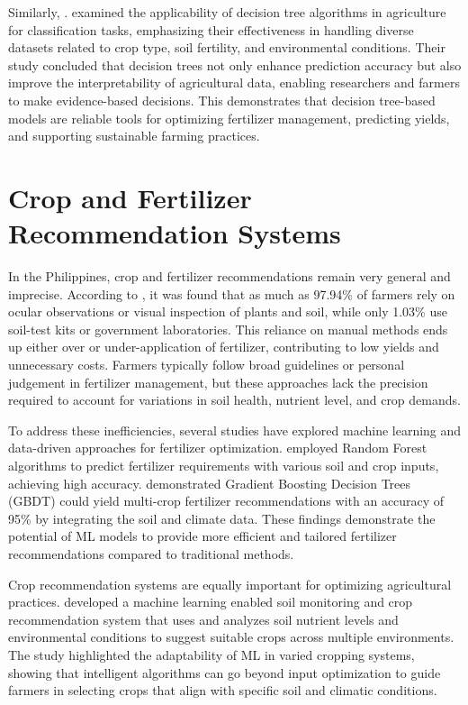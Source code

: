 {	Similarly, \cite{Sudha2022}. examined the applicability of decision tree algorithms in agriculture for classification tasks, emphasizing their effectiveness in handling diverse datasets related to crop type, soil fertility, and environmental conditions. Their study concluded that decision trees not only enhance prediction accuracy but also improve the interpretability of agricultural data, enabling researchers and farmers to make evidence-based decisions. This demonstrates that decision tree-based models are reliable tools for optimizing fertilizer management, predicting yields, and supporting sustainable farming practices.
	
	
	\section{Crop and Fertilizer Recommendation Systems}
	In the Philippines, crop and fertilizer recommendations remain very general and imprecise. According to \cite{Samaniego}, it was found that as much as 97.94\% of farmers rely on ocular observations or visual inspection of plants and soil, while only 1.03\% use soil-test kits or government laboratories. This reliance on manual methods ends up either over or under-application of fertilizer, contributing to low yields and unnecessary costs. Farmers typically follow broad guidelines or personal judgement in fertilizer management, but these approaches lack the precision required to account for variations in soil health, nutrient level, and crop demands.
	
	To address these inefficiencies, several studies have explored machine learning and data-driven approaches for fertilizer optimization. \cite{Sani2023CropRS} employed Random Forest algorithms to predict fertilizer requirements with various soil and crop inputs, achieving high accuracy. \cite{Lavanya2024} demonstrated Gradient Boosting Decision Trees (GBDT) could yield multi-crop fertilizer recommendations with an accuracy of 95\% by integrating the soil and climate data. These findings demonstrate the potential of ML models to provide more efficient and tailored fertilizer recommendations compared to traditional methods. 
	
	Crop recommendation systems are equally important for optimizing agricultural practices. \cite{Islam2023} developed a machine learning enabled soil monitoring and crop recommendation system that uses and analyzes soil nutrient levels and environmental conditions to suggest suitable crops across multiple environments. The study highlighted the adaptability of ML in varied cropping systems, showing that intelligent algorithms can go beyond input optimization to guide farmers in selecting crops that align with specific soil and climatic conditions.
	
}
